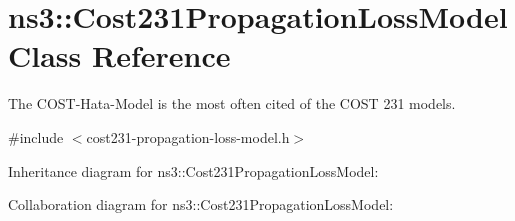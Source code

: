 \hypertarget{classns3_1_1Cost231PropagationLossModel}{}\section{ns3\+:\+:Cost231\+Propagation\+Loss\+Model Class Reference}
\label{classns3_1_1Cost231PropagationLossModel}


The C\+O\+S\+T-\/\+Hata-\/\+Model is the most often cited of the C\+O\+ST 231 models.  




{\ttfamily \#include $<$cost231-\/propagation-\/loss-\/model.\+h$>$}



Inheritance diagram for ns3\+:\+:Cost231\+Propagation\+Loss\+Model\+:


Collaboration diagram for ns3\+:\+:Cost231\+Propagation\+Loss\+Model\+:
